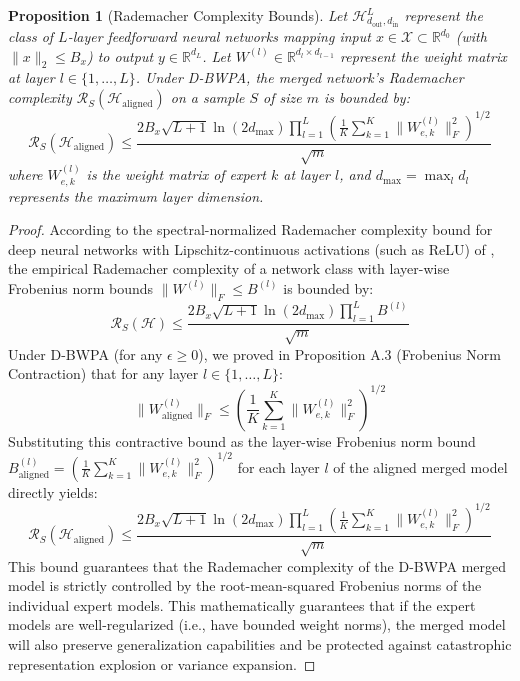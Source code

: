 \documentclass{article}
\theoremstyle{plain}
\newtheorem{proposition}[theorem]{Proposition}
\theoremstyle{definition}
\theoremstyle{remark}
\begin{document}
\begin{proposition}[Rademacher Complexity Bounds]
Let $\mathcal{H}_{d_{\mathrm{out}}, d_{\mathrm{in}}}^{L}$ represent the class of $L$-layer feedforward neural networks mapping input $x \in \mathcal{X} \subset \mathbb{R}^{d_0}$ (with $\|x\|_2 \le B_x$) to output $y \in \mathbb{R}^{d_L}$. Let $W^{(l)} \in \mathbb{R}^{d_l \times d_{l-1}}$ represent the weight matrix at layer $l \in \{1, \dots, L\}$. Under D-BWPA, the merged network's Rademacher complexity $\mathcal{R}_S(\mathcal{H}_{\mathrm{aligned}})$ on a sample $S$ of size $m$ is bounded by:
\begin{equation}
  \mathcal{R}_S(\mathcal{H}_{\mathrm{aligned}}) \le \frac{2 B_x \sqrt{L + 1} \ln(2d_{\max}) \prod_{l=1}^L \left( \frac{1}{K} \sum_{k=1}^K \|W_{e, k}^{(l)}\|_F^2 \right)^{1/2}}{\sqrt{m}}
\end{equation}
where $W_{e, k}^{(l)}$ is the weight matrix of expert $k$ at layer $l$, and $d_{\max} = \max_l d_l$ represents the maximum layer dimension.
\end{proposition}

\begin{proof}
According to the spectral-normalized Rademacher complexity bound for deep neural networks with Lipschitz-continuous activations (such as ReLU) of \cite{bartlett2017spectrally}, the empirical Rademacher complexity of a network class with layer-wise Frobenius norm bounds $\|W^{(l)}\|_F \le B^{(l)}$ is bounded by:
\begin{equation}
  \mathcal{R}_S(\mathcal{H}) \le \frac{2 B_x \sqrt{L + 1} \ln(2d_{\max}) \prod_{l=1}^L B^{(l)}}{\sqrt{m}}
\end{equation}
Under D-BWPA (for any $\epsilon \ge 0$), we proved in Proposition A.3 (Frobenius Norm Contraction) that for any layer $l \in \{1, \dots, L\}$:
\begin{equation}
  \|W_{\mathrm{aligned}}^{(l)}\|_F \le \left( \frac{1}{K} \sum_{k=1}^K \|W_{e, k}^{(l)}\|_F^2 \right)^{1/2}
\end{equation}
Substituting this contractive bound as the layer-wise Frobenius norm bound $B_{\mathrm{aligned}}^{(l)} = \left( \frac{1}{K} \sum_{k=1}^K \|W_{e, k}^{(l)}\|_F^2 \right)^{1/2}$ for each layer $l$ of the aligned merged model directly yields:
\begin{equation}
  \mathcal{R}_S(\mathcal{H}_{\mathrm{aligned}}) \le \frac{2 B_x \sqrt{L + 1} \ln(2d_{\max}) \prod_{l=1}^L \left( \frac{1}{K} \sum_{k=1}^K \|W_{e, k}^{(l)}\|_F^2 \right)^{1/2}}{\sqrt{m}}
\end{equation}
This bound guarantees that the Rademacher complexity of the D-BWPA merged model is strictly controlled by the root-mean-squared Frobenius norms of the individual expert models. This mathematically guarantees that if the expert models are well-regularized (i.e., have bounded weight norms), the merged model will also preserve generalization capabilities and be protected against catastrophic representation explosion or variance expansion.
\end{proof}
\end{document}
